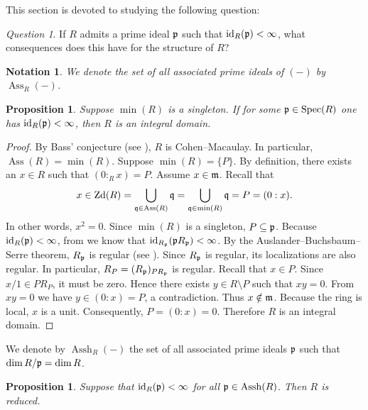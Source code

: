\documentclass[10. pt,a4paper]{amsart}
\newtheorem{proposition}[theorem]{Proposition}
\newtheorem{notation}[theorem]{Notation}
\theoremstyle{definition}
\theoremstyle{remark}
\newtheorem{question}[theorem]{Question}
\newcommand{\Ass}{\operatorname{Ass}}
\newcommand{\Assh}{\operatorname{Assh}}
\newcommand{\Spec}{\operatorname{Spec}}
\newcommand{\id}{\operatorname{id}}
\newcommand{\Zd}{\operatorname{Zd}}
\newcommand{\fm}{\frak{m}}
\newcommand{\fp}{\frak{p}}
\newcommand{\fq}{\frak{q}}
\begin{document}
This section is devoted to studying the following question:

\begin{question}\label{d21}
	If \(R\) admits a prime ideal \(\fp\) such that \(\id_R(\fp) < \infty\), what consequences does this have for the structure of \(R\)?
\end{question}

\begin{notation}
	We denote the set of all associated prime ideals of \((-)\) by \(\Ass_R(-)\).
\end{notation}

\begin{proposition}\label{one}
	Suppose \(\min(R)\) is a singleton. If for some \(\fp\in\Spec(R)\) one has \(\id_R(\fp)<\infty\), then \(R\) is an integral domain.
\end{proposition}

\begin{proof}
	By Bass'  conjecture (see \cite[Section 9.6]{BH}), \(R\) is Cohen--Macaulay. In particular, \(\Ass(R)=\min(R)\).  
	Suppose \(\min(R)=\{P\}\). By definition, there exists an \(x\in R\) such that \((0:_Rx)=P\). Assume \(x\in \fm\).  
	Recall that  
	\[
	x\in\Zd(R)=\bigcup_{\fq\in\Ass(R)}\fq=\bigcup_{\fq\in\min(R)}\fq=P=(0:x).
	\]  
	In other words, \(x^2=0\).  
	Since \(\min(R)\) is a singleton, \(P\subseteq \fp\).  
	Because \(\id_R(\fp)<\infty\), from \cite[Proposition 3.1.9]{BH} we know that \(\id_{R_{\fp}}(\fp R_{\fp})<\infty\).  
	By the Auslander--Buchsbaum--Serre theorem, \(R_{\fp}\) is regular (see \cite[Theorem 2.2.7]{BH}).  
	Since \(R_{\fp}\) is regular, its localizations are also regular. In particular, \(R_{P}=(R_{\fp})_{P R_{\fp}}\) is regular.  
	Recall that \(x\in P\). Since \(x/1\in P R_{P}\), it must be zero. Hence there exists \(y\in R\setminus P\) such that \(xy=0\).  
	From \(xy=0\) we have \(y\in(0:x)=P\), a contradiction. Thus \(x\notin\fm\).  
	Because the ring is local, \(x\) is a unit. Consequently, \(P=(0:x)=0\). Therefore \(R\) is an integral domain.
\end{proof}

We denote by $\Assh_R(-)$ the set of all associated prime ideals $\fp$ such that $\dim R/\fp = \dim R$.

\begin{proposition}
	Suppose that $\id_R(\fp)<\infty$ for all $\fp\in\Assh(R)$. Then $R$ is reduced.
\end{proposition}
\end{document}
